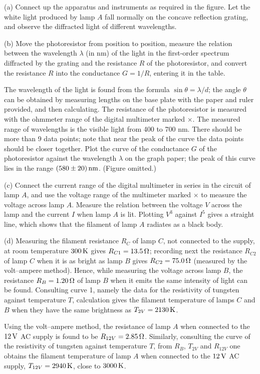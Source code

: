 (a) Connect up the apparatus and instruments as required in the figure. Let the white light produced by lamp $A$ fall normally on the concave reflection grating, and observe the diffracted light of different wavelengths.

(b) Move the photoresistor from position to position, measure the relation between the wavelength $\lambda$ (in nm) of the light in the first-order spectrum diffracted by the grating and the resistance $R$ of the photoresistor, and convert the resistance $R$ into the conductance $G=1/R$, entering it in the table.

The wavelength of the light is found from the formula $\sin\theta=\lambda/d$; the angle $\theta$ can be obtained by measuring lengths on the base plate with the paper and ruler provided, and then calculating. The resistance of the photoresistor is measured with the ohmmeter range of the digital multimeter marked $\times$. The measured range of wavelengths is the visible light from 400 to 700 nm. There should be more than 9 data points; note that near the peak of the curve the data points should be closer together. Plot the curve of the conductance $G$ of the photoresistor against the wavelength $\lambda$ on the graph paper; the peak of this curve lies in the range $(580\pm20)\,\mathrm{nm}$. (Figure omitted.)

(c) Connect the current range of the digital multimeter in series in the circuit of lamp $A$, and use the voltage range of the multimeter marked $\times$ to measure the voltage across lamp $A$. Measure the relation between the voltage $V$ across the lamp and the current $I$ when lamp $A$ is lit. Plotting $V^3$ against $I^5$ gives a straight line, which shows that the filament of lamp $A$ radiates as a black body.

(d) Measuring the filament resistance $R_C$ of lamp $C$, not connected to the supply, at room temperature $300\,\mathrm{K}$ gives $R_{C1}=13.5\,\mathrm{\Omega}$; recording next the resistance $R_{C2}$ of lamp $C$ when it is as bright as lamp $B$ gives $R_{C2}=75.0\,\mathrm{\Omega}$ (measured by the volt--ampere method). Hence, while measuring the voltage across lamp $B$, the resistance $R_B=1.20\,\mathrm{\Omega}$ of lamp $B$ when it emits the same intensity of light can be found. Consulting curve 1, namely the data for the resistivity of tungsten against temperature $T$, calculation gives the filament temperature of lamps $C$ and $B$ when they have the same brightness as $T_{2V}=2130\,\mathrm{K}$.

Using the volt--ampere method, the resistance of lamp $A$ when connected to the $12\,\mathrm{V}$ AC supply is found to be $R_{12V}=2.85\,\mathrm{\Omega}$. Similarly, consulting the curve of the resistivity of tungsten against temperature $T$, from $R_B$, $T_{2V}$ and $R_{12V}$ one obtains the filament temperature of lamp $A$ when connected to the $12\,\mathrm{V}$ AC supply, $T_{12V}=2940\,\mathrm{K}$, close to $3000\,\mathrm{K}$.

